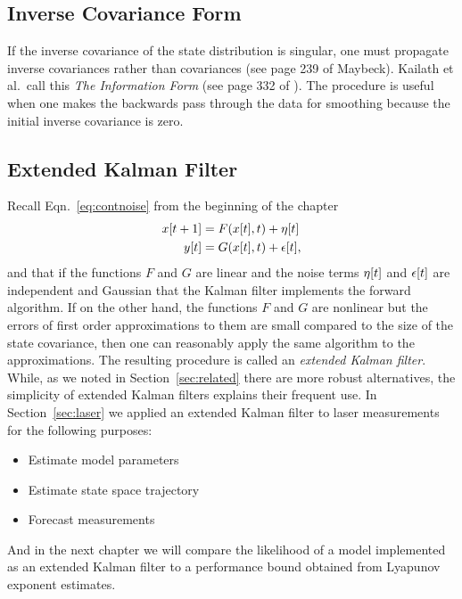 \subsection{Inverse Covariance Form}
\label{sec:DetailInverse}

 If the inverse covariance of the state distribution is singular, one
 must propagate inverse covariances rather than covariances (see page
 239 of Maybeck\cite{Maybeck79}).  Kailath et al.\ call this \emph{The
   Information Form} (see page 332 of \cite{KSH00}).
  The procedure is useful when one makes the
 backwards pass through the data for smoothing because the initial
 inverse covariance is zero.

\subsection{Extended Kalman Filter}
\label{sec:EKF}

Recall Eqn.~\eqref{eq:contnoise} from the beginning of the chapter
\begin{align*}
  {x}{[t+1]} &= F({x}{[t]},t) + {\eta}{[t]}\\
  {y}{[t]}   &= G({x}{[t]},t) + {\epsilon}{[t]},
\end{align*}
and that if the functions $F$ and $G$ are linear and the noise terms
${\eta}{[t]}$ and ${\epsilon}{[t]}$ are independent and Gaussian
that the Kalman filter implements the forward algorithm.  If on the
other hand, the functions $F$ and $G$ are nonlinear but the errors of
first order approximations to them are small compared to the size of
the state covariance, then one can reasonably apply the same algorithm to the
approximations.  The resulting procedure is called an \emph{extended
  Kalman filter}.  While, as we noted in Section~\ref{sec:related}
there are more robust alternatives, the simplicity of extended Kalman
filters explains their frequent use.  In Section~\ref{sec:laser} we
applied an extended Kalman filter to laser measurements for the
following purposes:
\begin{itemize}
\item Estimate model parameters
\item Estimate state space trajectory
\item Forecast measurements
\end{itemize}
And in the next chapter we will compare the likelihood of a model
implemented as an extended Kalman filter to a performance bound
obtained from Lyapunov exponent estimates.

